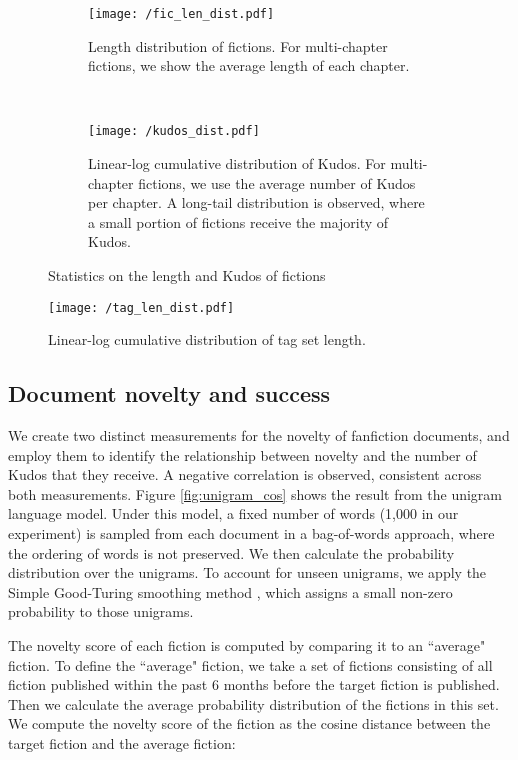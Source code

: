 \documentclass[a4paper]{article}
\begin{document}
\begin{figure}
    \centering
    \begin{subfigure}[b]{0.7\textwidth}
        \texttt{[image: /fic\_len\_dist.pdf]}
        \caption{Length distribution of fictions. For multi-chapter fictions, we show the average length of each chapter.}
        \label{fig:length_dist}
    \end{subfigure}
    ~ %
    \begin{subfigure}[b]{0.7\textwidth}
        \texttt{[image: /kudos\_dist.pdf]}
        \caption{Linear-log cumulative distribution of Kudos. For multi-chapter fictions, we use the average number of Kudos per chapter. A long-tail distribution is observed, where a small portion of fictions receive the majority of Kudos.}
        \label{fig:kudos_dist}
    \end{subfigure}
    \caption{Statistics on the length and Kudos of fictions}\label{fig:stats_len_kudos_tags}

\end{figure}

\begin{figure}
    \centering
        \texttt{[image: /tag\_len\_dist.pdf]}
        \caption{Linear-log cumulative distribution of tag set length. }
        \label{fig:tag_set_len}
\end{figure}

\subsection*{Document novelty and success}
We create two distinct measurements for the novelty of fanfiction documents, and employ them to identify the relationship between novelty and the number of Kudos that they receive. A negative correlation is observed, consistent across both measurements. Figure \ref{fig:unigram_cos} shows the result from the unigram language model. Under this model, a fixed number of words (1,000 in our experiment) is sampled from each document in a bag-of-words approach, where the ordering of words is not preserved. We then calculate the probability distribution over the unigrams. To account for unseen unigrams, we apply the Simple Good-Turing smoothing method \cite{gales1995good}, which assigns a small non-zero probability to those unigrams. 

The novelty score of each fiction is computed by comparing it to an ``average" fiction. To define the ``average" fiction, we take a set of fictions consisting of all fiction published within the past 6 months before the target fiction is published. Then we calculate the average probability distribution of the fictions in this set. We compute the novelty score of the fiction as the cosine distance between the target fiction and the average fiction:
\end{document}
